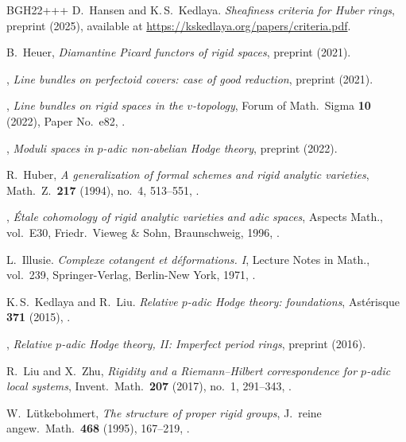 \begin{thebibliography}{BGH{\etalchar{+}}22+++}
D.~Hansen and  K.\,S.~Kedlaya.
{\em Sheafiness criteria for {H}uber rings}, preprint (2025), available at \url{https://kskedlaya.org/papers/criteria.pdf}.

B.~Heuer, 
{\em {D}iamantine {P}icard functors of rigid spaces}, preprint  (2021).
	
\bysame, 
{\em Line bundles on perfectoid covers: case of good reduction}, preprint  (2021).
	
\bysame, 
{\em Line bundles on rigid spaces in the $v$-topology}, Forum of Math.\ Sigma \textbf{10} (2022), Paper No.~e82, .
	
\bysame, 
{\em Moduli spaces in $p$-adic non-abelian {H}odge theory}, preprint  (2022).
	
R.~Huber, 
{\em {A} generalization of formal schemes and rigid analytic varieties}, Math.~Z.\ \textbf{217} (1994), no.~4, 513--551, .
	
\bysame, 
{\em \'{E}tale cohomology of rigid analytic varieties and adic spaces}, Aspects Math., vol.~E30, Friedr.\ Vieweg \& Sohn, Braunschweig, 1996, .
	
L.~Illusie.
{\em Complexe cotangent et d\'{e}formations. {I}}, Lecture Notes in Math., vol.~239, Springer-Verlag, Berlin-New York, 1971, .
	
K.\,S.~Kedlaya and  R.~Liu.
{\em {R}elative {$p$}-adic {H}odge theory: foundations}, Ast\'{e}risque \textbf{371} (2015), .

\bysame, 
{\em {R}elative $p$-adic {H}odge theory, {I}{I}: {I}mperfect period rings}, preprint  (2016).

R.~Liu and  X.~Zhu, 
{\em Rigidity and a {R}iemann--{H}ilbert correspondence for {$p$}-adic local systems}, Invent.\ Math.\ \textbf{207} (2017), no.~1, 291--343, .

W.~L{\"{u}}tkebohmert, 
{\em The structure of proper rigid groups}, J.~reine angew.\ Math.\ \textbf{468} (1995), 167--219, .


\end{thebibliography}
